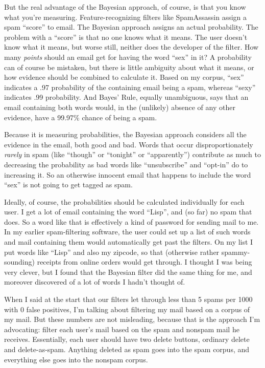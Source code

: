 But the real advantage of the Bayesian approach, of course, is that you
know what you're measuring. Feature-recognizing filters like
SpamAssassin assign a spam ``score'' to email. The Bayesian approach
assigns an actual probability. The problem with a ``score'' is that no
one knows what it means. The user doesn't know what it means, but worse
still, neither does the developer of the filter. How many \emph{points}
should an email get for having the word ``sex'' in it? A probability can
of course be mistaken, but there is little ambiguity about what it
means, or how evidence should be combined to calculate it. Based on my
corpus, ``sex'' indicates a .97 probability of the containing email
being a spam, whereas ``sexy'' indicates .99 probability. And Bayes'
Rule, equally unambiguous, says that an email containing both words
would, in the (unlikely) absence of any other evidence, have a 99.97\%
chance of being a spam.

Because it is measuring probabilities, the Bayesian approach considers
all the evidence in the email, both good and bad. Words that occur
disproportionately \emph{rarely} in spam (like ``though'' or ``tonight''
or ``apparently'') contribute as much to decreasing the probability as
bad words like ``unsubscribe'' and ``opt-in'' do to increasing it. So an
otherwise innocent email that happens to include the word ``sex'' is not
going to get tagged as spam.

Ideally, of course, the probabilities should be calculated individually
for each user. I get a lot of email containing the word ``Lisp'', and
(so far) no spam that does. So a word like that is effectively a kind of
password for sending mail to me. In my earlier spam-filtering software,
the user could set up a list of such words and mail containing them
would automatically get past the filters. On my list I put words like
``Lisp'' and also my zipcode, so that (otherwise rather spammy-sounding)
receipts from online orders would get through. I thought I was being
very clever, but I found that the Bayesian filter did the same thing for
me, and moreover discovered of a lot of words I hadn't thought of.

When I said at the start that our filters let through less than 5 spams
per 1000 with 0 false positives, I'm talking about filtering my mail
based on a corpus of my mail. But these numbers are not misleading,
because that is the approach I'm advocating: filter each user's mail
based on the spam and nonspam mail he receives. Essentially, each user
should have two delete buttons, ordinary delete and delete-as-spam.
Anything deleted as spam goes into the spam corpus, and everything else
goes into the nonspam corpus.

